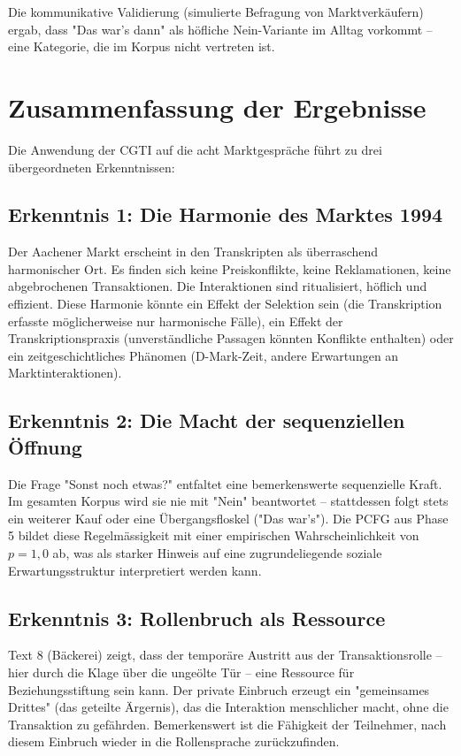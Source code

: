 \documentclass[12pt,a4paper]{article}
\begin{document}
Die kommunikative Validierung (simulierte Befragung von Marktverkäufern) ergab, dass "Das war's dann" als höfliche Nein-Variante im Alltag vorkommt – eine Kategorie, die im Korpus nicht vertreten ist.

\section{Zusammenfassung der Ergebnisse}

Die Anwendung der CGTI auf die acht Marktgespräche führt zu drei übergeordneten Erkenntnissen:

\subsection{Erkenntnis 1: Die Harmonie des Marktes 1994}

Der Aachener Markt erscheint in den Transkripten als überraschend harmonischer Ort. Es finden sich keine Preiskonflikte, keine Reklamationen, keine abgebrochenen Transaktionen. Die Interaktionen sind ritualisiert, höflich und effizient. Diese Harmonie könnte ein Effekt der Selektion sein (die Transkription erfasste möglicherweise nur harmonische Fälle), ein Effekt der Transkriptionspraxis (unverständliche Passagen könnten Konflikte enthalten) oder ein zeitgeschichtliches Phänomen (D-Mark-Zeit, andere Erwartungen an Marktinteraktionen).

\subsection{Erkenntnis 2: Die Macht der sequenziellen Öffnung}

Die Frage "Sonst noch etwas?" entfaltet eine bemerkenswerte sequenzielle Kraft. Im gesamten Korpus wird sie nie mit "Nein" beantwortet – stattdessen folgt stets ein weiterer Kauf oder eine Übergangsfloskel ("Das war's"). Die PCFG aus Phase 5 bildet diese Regelmässigkeit mit einer empirischen Wahrscheinlichkeit von $p=1,0$ ab, was als starker Hinweis auf eine zugrundeliegende soziale Erwartungsstruktur interpretiert werden kann.

\subsection{Erkenntnis 3: Rollenbruch als Ressource}

Text 8 (Bäckerei) zeigt, dass der temporäre Austritt aus der Transaktionsrolle – hier durch die Klage über die ungeölte Tür – eine Ressource für Beziehungsstiftung sein kann. Der private Einbruch erzeugt ein "gemeinsames Drittes" (das geteilte Ärgernis), das die Interaktion menschlicher macht, ohne die Transaktion zu gefährden. Bemerkenswert ist die Fähigkeit der Teilnehmer, nach diesem Einbruch wieder in die Rollensprache zurückzufinden.
\end{document}
